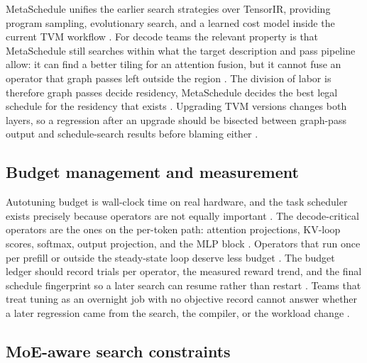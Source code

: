 MetaSchedule unifies the earlier search strategies over TensorIR, providing program sampling, evolutionary search, and a learned cost model inside the current TVM workflow \citep{chen2018tvm,zheng2020ansor}. For decode teams the relevant property is that MetaSchedule still searches within what the target description and pass pipeline allow: it can find a better tiling for an attention fusion, but it cannot fuse an operator that graph passes left outside the region \citep{chen2018tvm,patel2025llminference}. The division of labor is therefore graph passes decide residency, MetaSchedule decides the best legal schedule for the residency that exists \citep{lai2023relax,memoryfloor2026}. Upgrading TVM versions changes both layers, so a regression after an upgrade should be bisected between graph-pass output and schedule-search results before blaming either \citep{chen2020compilerbasedhardw,patel2025llminference}.

\subsection{Budget management and measurement}

Autotuning budget is wall-clock time on real hardware, and the task scheduler exists precisely because operators are not equally important \citep{zheng2020ansor,chen2018autotvm}. The decode-critical operators are the ones on the per-token path: attention projections, KV-loop scores, softmax, output projection, and the MLP block \citep{dao2022flashattention,taxbreak2026}. Operators that run once per prefill or outside the steady-state loop deserve less budget \citep{patel2025llminference,memoryfloor2026}. The budget ledger should record trials per operator, the measured reward trend, and the final schedule fingerprint so a later search can resume rather than restart \citep{chen2018autotvm,chen2020compilerbasedhardw}. Teams that treat tuning as an overnight job with no objective record cannot answer whether a later regression came from the search, the compiler, or the workload change \citep{taxbreak2026,memoryfloor2026}.

\subsection{MoE-aware search constraints}

